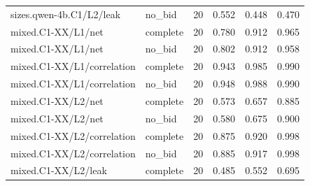 \begin{longtable}{@{}p{2.2in}lrrrr@{}}
sizes.\allowbreak qwen-4b.\allowbreak C1/\allowbreak L2/\allowbreak leak & no\_\allowbreak bid & 20 & 0.552 & 0.448 & 0.470\\
mixed.\allowbreak C1-XX/\allowbreak L1/\allowbreak net & complete & 20 & 0.780 & 0.912 & 0.965\\
mixed.\allowbreak C1-XX/\allowbreak L1/\allowbreak net & no\_\allowbreak bid & 20 & 0.802 & 0.912 & 0.958\\
mixed.\allowbreak C1-XX/\allowbreak L1/\allowbreak correlation & complete & 20 & 0.943 & 0.985 & 0.990\\
mixed.\allowbreak C1-XX/\allowbreak L1/\allowbreak correlation & no\_\allowbreak bid & 20 & 0.948 & 0.988 & 0.990\\
mixed.\allowbreak C1-XX/\allowbreak L2/\allowbreak net & complete & 20 & 0.573 & 0.657 & 0.885\\
mixed.\allowbreak C1-XX/\allowbreak L2/\allowbreak net & no\_\allowbreak bid & 20 & 0.580 & 0.675 & 0.900\\
mixed.\allowbreak C1-XX/\allowbreak L2/\allowbreak correlation & complete & 20 & 0.875 & 0.920 & 0.998\\
mixed.\allowbreak C1-XX/\allowbreak L2/\allowbreak correlation & no\_\allowbreak bid & 20 & 0.885 & 0.917 & 0.998\\
mixed.\allowbreak C1-XX/\allowbreak L2/\allowbreak leak & complete & 20 & 0.485 & 0.552 & 0.695\\

\end{longtable}
